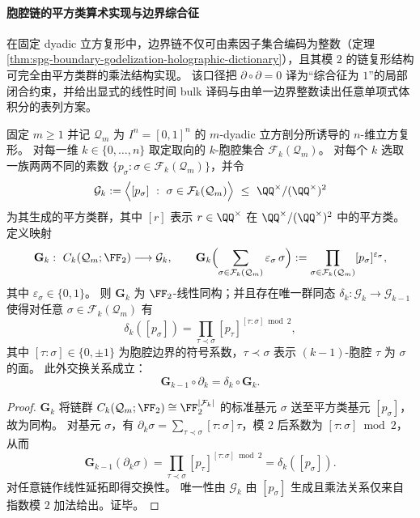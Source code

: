 
\paragraph{胞腔链的平方类算术实现与边界综合征}\label{par:spg-dyadic-squareclass-syndrome}
在固定 dyadic 立方复形中，边界链不仅可由素因子集合编码为整数（定理 \ref{thm:spg-boundary-godelization-holographic-dictionary}），且其模 \(2\) 的链复形结构可完全由平方类群的乘法结构实现。
该口径把 \(\partial\circ\partial=0\) 译为“综合征为 \(1\)”的局部闭合约束，并给出显式的线性时间 bulk 译码与由单一边界整数读出任意单项式体积分的表列方案。

\begin{theorem}\label{thm:spg-dyadic-squareclass-chain-complex}
固定 \(m\ge 1\) 并记 \(\mathcal Q_m\) 为 \(I^n=[0,1]^n\) 的 \(m\)-dyadic 立方剖分所诱导的 \(n\)-维立方复形。
对每一维 \(k\in\{0,\dots,n\}\) 取定取向的 \(k\)-胞腔集合 \(\mathcal F_k(\mathcal Q_m)\)。
对每个 \(k\) 选取一族两两不同的素数 \(\{p_\sigma:\sigma\in\mathcal F_k(\mathcal Q_m)\}\)，并令
\[
\mathcal G_k:=\Big\langle [p_\sigma]\ :\ \sigma\in\mathcal F_k(\mathcal Q_m)\Big\rangle\ \le\ \QQ^\times/(\QQ^\times)^2
\]
为其生成的平方类群，其中 \([r]\) 表示 \(r\in\QQ^\times\) 在 \(\QQ^\times/(\QQ^\times)^2\) 中的平方类。
定义映射
\[
\mathbf G_k:\ C_k(\mathcal Q_m;\FF_2)\longrightarrow \mathcal G_k,\qquad
\mathbf G_k\Bigl(\sum_{\sigma\in\mathcal F_k(\mathcal Q_m)}\varepsilon_\sigma\,\sigma\Bigr)
:=\prod_{\sigma\in\mathcal F_k(\mathcal Q_m)} [p_\sigma]^{\varepsilon_\sigma},
\]
其中 \(\varepsilon_\sigma\in\{0,1\}\)。
则 \(\mathbf G_k\) 为 \(\FF_2\)-线性同构；并且存在唯一群同态 \(\delta_k:\mathcal G_k\to\mathcal G_{k-1}\) 使得对任意 \(\sigma\in\mathcal F_k(\mathcal Q_m)\) 有
\[
\delta_k([p_\sigma])=\prod_{\tau\prec\sigma}[p_\tau]^{[\tau:\sigma]\bmod 2},
\]
其中 \([\tau:\sigma]\in\{0,\pm 1\}\) 为胞腔边界的符号系数，\(\tau\prec\sigma\) 表示 \((k-1)\)-胞腔 \(\tau\) 为 \(\sigma\) 的面。
此外交换关系成立：
\[
\mathbf G_{k-1}\circ \partial_k=\delta_k\circ \mathbf G_k.
\]
\end{theorem}
\begin{proof}
\(\mathbf G_k\) 将链群 \(C_k(\mathcal Q_m;\FF_2)\cong \FF_2^{|\mathcal F_k|}\) 的标准基元 \(\sigma\) 送至平方类基元 \([p_\sigma]\)，故为同构。
对基元 \(\sigma\)，有
\(
\partial_k\sigma=\sum_{\tau\prec\sigma}[\tau:\sigma]\tau
\)，模 \(2\) 后系数为 \([\tau:\sigma]\bmod 2\)，从而
\[
\mathbf G_{k-1}(\partial_k\sigma)
=\prod_{\tau\prec\sigma}[p_\tau]^{[\tau:\sigma]\bmod 2}
=\delta_k([p_\sigma]).
\]
对任意链作线性延拓即得交换性。
唯一性由 \(\mathcal G_k\) 由 \([p_\sigma]\) 生成且乘法关系仅来自指数模 \(2\) 加法给出。证毕。
\end{proof}

